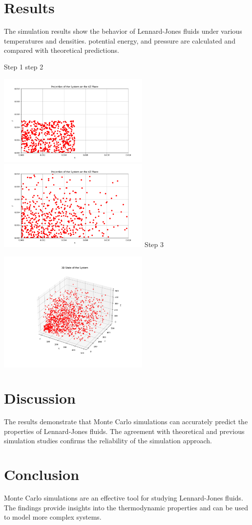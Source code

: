 \documentclass[a4paper,12pt]{article}
\begin{document}
\section{Results}
The simulation results show the behavior of Lennard-Jones fluids under various temperatures and densities. potential energy, and pressure are calculated and compared with theoretical predictions.


\hspace{1cm}Step 1 \hspace{6cm} step 2

\includegraphics[width=7.5cm]{08.png} \includegraphics[width=7.5cm]{09.png}
\newpage
Step 3 

\includegraphics[width=7.5cm]{10.png}
\section{Discussion}
The results demonstrate that Monte Carlo simulations can accurately predict the properties of Lennard-Jones fluids. The agreement with theoretical and previous simulation studies confirms the reliability of the simulation approach. 

\section{Conclusion}
Monte Carlo simulations are an effective tool for studying Lennard-Jones fluids. The findings provide insights into the thermodynamic properties and can be used to model more complex systems. 



\end{document}
